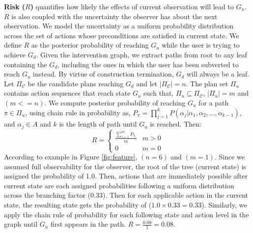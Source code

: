 \documentclass[letterpaper]{article}
\theoremstyle{plain}
\begin{document}
\textbf{Risk ($R$)} quantifies how likely the effects of current observation will lead to $G_u$. $R$ is also coupled with the uncertainty the observer has about the next observation. We model the uncertainty as a uniform probability distribution across the set of actions whose preconditions are satisfied in current state. We define $R$ as the posterior probability of reaching $G_u$ while the user is trying to achieve $G_d$. Given the intervention graph, we extract paths from root to any leaf containing the $G_d$, including the ones in which the user has been subverted to reach $G_u$ instead. By virtue of construction termination, $G_d$ will always be a leaf.
Let $\Pi_{\mathcal{C}}$ be the candidate plans reaching $G_d$ and let $\left | \Pi_{\mathcal{C}} \right |=n$. The plan set $\Pi_{u}$ contains action sequences that reach state $G_u$ such that, $\Pi_{u} \subseteq \Pi_{\mathcal{C}}$, $\left | \Pi_{u} \right |=m$ and $(m<=n)$. We compute posterior probability of reaching $G_u$ for a path $\pi \in \Pi_{u}$, using chain rule in probability as, $P_{\pi}=\prod_{j=1}^{k}P(\alpha_j|\alpha_1, \alpha_2,...,\alpha_{k-1})$, and $\alpha_{j} \in A$ and $k$ is the length of path until $G_u$ is reached. Then: 
\begin{equation*} 
R = \left\{\begin{matrix} \frac{\sum_{i=1}^{m}P_{\pi_i}}{m} & m>0\\ 0 &  m=0 \end{matrix}\right.
\end{equation*}
According to example in Figure \ref{fig:feature}, $(n=6)$ and $(m=1)$. Since we assumed full observability for the observer, the root of the tree (current state) is assigned the probability of 1.0. Then, actions that are immediately possible after current state are each assigned probabilities following a uniform distribution across the branching factor (0.33). Then for each applicable action in the current state, the resulting state gets the probability of ($1.0\times0.33=0.33$). Similarly, we apply the chain rule of probability for each following state and action level in the graph until $G_u$ first appears in the path. $R=\frac{0.08}{1}=0.08$.
\end{document}
